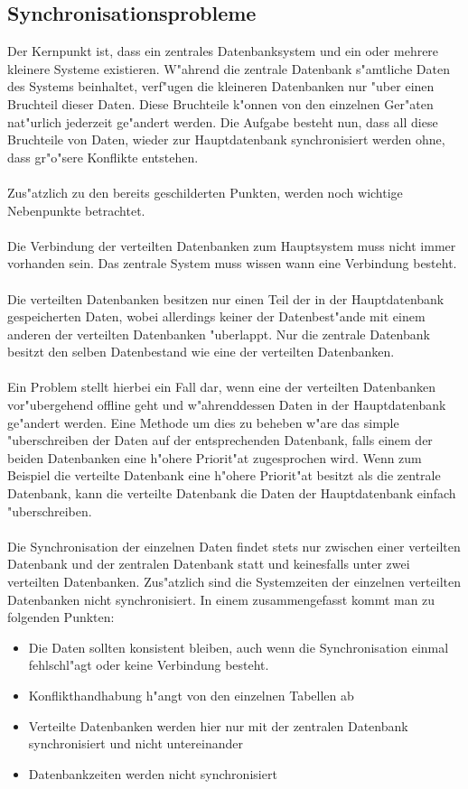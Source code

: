 \documentclass[a4paper,14pt]{scrreprt}
\begin{document}
\subsection{Synchronisationsprobleme}
Der Kernpunkt ist, dass ein zentrales Datenbanksystem und ein oder mehrere kleinere Systeme existieren. W"ahrend die zentrale Datenbank s"amtliche Daten des Systems beinhaltet, verf"ugen die kleineren Datenbanken nur "uber einen Bruchteil dieser Daten. Diese Bruchteile k"onnen von den einzelnen Ger"aten nat"urlich jederzeit ge"andert werden. Die Aufgabe besteht nun, dass all diese Bruchteile von Daten, wieder zur Hauptdatenbank synchronisiert werden ohne, dass gr"o"sere Konflikte entstehen.\\\\Zus"atzlich zu den bereits geschilderten Punkten, werden noch wichtige Nebenpunkte betrachtet.\\\\Die Verbindung der verteilten Datenbanken zum Hauptsystem muss nicht immer vorhanden sein. Das zentrale System muss wissen wann eine Verbindung besteht.\\\\Die verteilten Datenbanken besitzen nur einen Teil der in der Hauptdatenbank gespeicherten Daten, wobei allerdings keiner der Datenbest"ande mit einem anderen der verteilten Datenbanken "uberlappt. Nur die zentrale Datenbank besitzt den selben Datenbestand wie eine der verteilten Datenbanken.\\\\Ein Problem stellt hierbei ein Fall dar, wenn eine der verteilten Datenbanken vor"ubergehend offline geht und w"ahrenddessen Daten in der Hauptdatenbank ge"andert werden. Eine Methode um dies zu beheben w"are das simple "uberschreiben der Daten auf der entsprechenden Datenbank, falls einem der beiden Datenbanken eine h"ohere Priorit"at zugesprochen wird. Wenn zum Beispiel die verteilte Datenbank eine h"ohere Priorit"at besitzt als die zentrale Datenbank, kann die verteilte Datenbank die Daten der Hauptdatenbank einfach "uberschreiben. \\\\ Die Synchronisation der einzelnen Daten findet stets nur zwischen einer verteilten Datenbank und der zentralen Datenbank statt und keinesfalls unter zwei verteilten Datenbanken. Zus"atzlich sind die Systemzeiten der einzelnen verteilten Datenbanken nicht synchronisiert. In einem zusammengefasst kommt man zu folgenden Punkten:
\begin{itemize}
\item Die Daten sollten konsistent bleiben, auch wenn die Synchronisation einmal fehlschl"agt oder keine Verbindung besteht.
\item Konflikthandhabung h"angt von den einzelnen Tabellen ab
\item Verteilte Datenbanken werden hier nur mit der zentralen Datenbank synchronisiert und nicht untereinander
\item Datenbankzeiten werden nicht synchronisiert
\end{itemize}
\cite{diploBork}
\end{document}
